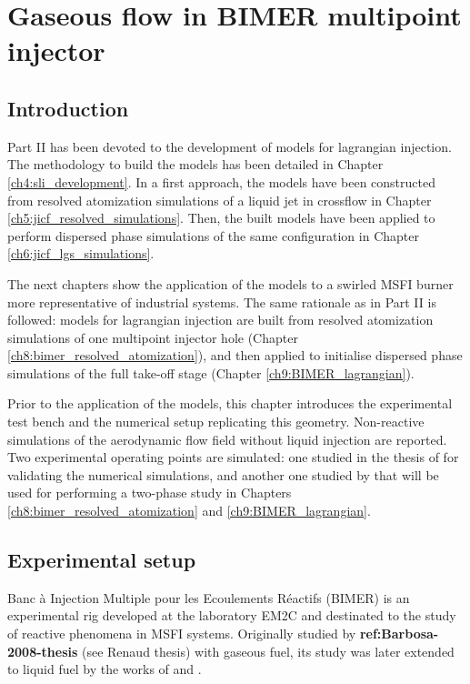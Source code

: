 \chapter{Gaseous flow in BIMER multipoint injector}
	\label{ch9:bimer_test_bench_and_aero}

\section{Introduction}

Part II has been devoted to the development of models for lagrangian injection. The methodology to build the models has been detailed in Chapter \ref{ch4:sli_development}. In a first approach, the models have been constructed from resolved atomization simulations of a liquid jet in crossflow in Chapter \ref{ch5:jicf_resolved_simulations}. Then, the built models have been applied to perform dispersed phase simulations of the same configuration in Chapter \ref{ch6:jicf_lgs_simulations}.

The next chapters show the application of the models to a swirled MSFI burner more representative of industrial systems. The same rationale as in Part II is followed: models for lagrangian injection are built from resolved atomization simulations of one multipoint injector hole (Chapter \ref{ch8:bimer_resolved_atomization}), and then applied to initialise dispersed phase simulations of the full take-off stage (Chapter \ref{ch9:BIMER_lagrangian}). 

Prior to the application of the models, this chapter introduces the experimental test bench and the numerical setup replicating this geometry. Non-reactive simulations of the aerodynamic flow field without liquid injection are reported. Two experimental operating points are simulated: one studied in the thesis of  for validating the numerical simulations, and another one studied by  that will be used for performing a two-phase study in Chapters \ref{ch8:bimer_resolved_atomization} and \ref{ch9:BIMER_lagrangian}.


\section{Experimental setup}

Banc à Injection Multiple pour les Ecoulements Réactifs (BIMER) is an experimental rig developed at the laboratory EM2C and destinated to the study of reactive phenomena in MSFI systems. Originally studied by \textbf{ref:Barbosa-2008-thesis} (see Renaud thesis) with gaseous fuel, its study was later extended to liquid fuel by the works of  and .


